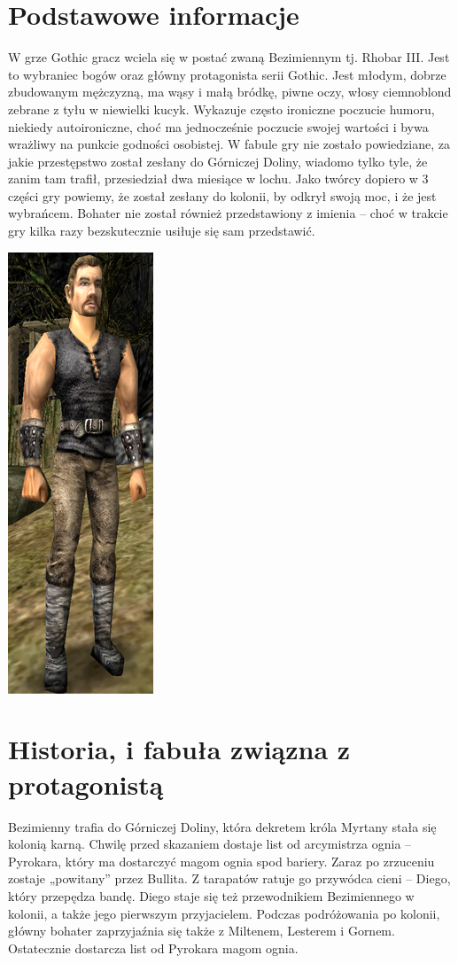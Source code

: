 \documentclass[11pt,polish, openany]{book}
\begin{document}
\section{Podstawowe informacje}
W grze Gothic gracz wciela się w postać zwaną Bezimiennym tj. Rhobar III. Jest to wybraniec bogów oraz główny protagonista serii Gothic. Jest młodym, dobrze zbudowanym mężczyzną, ma wąsy i małą bródkę, piwne oczy, włosy ciemnoblond zebrane z tyłu w niewielki kucyk. Wykazuje często ironiczne poczucie humoru, niekiedy autoironiczne, choć ma jednocześnie poczucie swojej wartości i bywa wrażliwy na punkcie godności osobistej. W fabule gry nie zostało powiedziane, za jakie przestępstwo został zesłany do Górniczej Doliny, wiadomo tylko tyle, że zanim tam trafił, przesiedział dwa miesiące w lochu. Jako twórcy dopiero w 3 części gry powiemy, że został zesłany do kolonii, by odkrył swoją moc, i że jest wybrańcem. Bohater nie został również przedstawiony z imienia – choć w trakcie gry kilka razy bezskutecznie usiłuje się sam przedstawić.
\begin{center}
	\includegraphics[scale=0.6]{bezi.png}
\end{center}
\section{Historia, i fabuła związna z protagonistą}
Bezimienny trafia do Górniczej Doliny, która dekretem króla Myrtany stała się kolonią karną. Chwilę przed skazaniem dostaje list od arcymistrza ognia – Pyrokara, który ma dostarczyć magom ognia spod bariery. Zaraz po zrzuceniu zostaje „powitany” przez Bullita. Z tarapatów ratuje go przywódca cieni – Diego, który przepędza bandę. Diego staje się też przewodnikiem Bezimiennego w kolonii, a także jego pierwszym przyjacielem. Podczas podróżowania po kolonii, główny bohater zaprzyjaźnia się także z Miltenem, Lesterem i Gornem. Ostatecznie dostarcza list od Pyrokara magom ognia.
\end{document}

